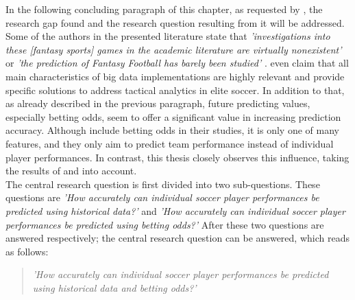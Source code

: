 In the following concluding paragraph of this chapter, as requested by \citet{webster_guest_2002}, the research gap found and the research question resulting from it will be addressed. Some of the authors in the presented literature state that \emph{'investigations into these [fantasy sports] games in the academic literature are virtually nonexistent'} \parencite[, p. 1]{landers_machine_2017} or \emph{'the prediction of Fantasy Football has barely been studied'} \parencite[, p. 1]{lutz_fantasy_2015}. \citet{rein_big_2016} even claim that all main characteristics of big data implementations are highly relevant and provide specific solutions to address tactical analytics in elite soccer. In addition to that, as already described in the previous paragraph, future predicting values, especially betting odds, seem to offer a significant value in increasing prediction accuracy. Although \citet{deng_analysis_2020} include betting odds in their studies, it is only one of many features, and they only aim to predict team performance instead of individual player performances. In contrast, this thesis closely observes this influence, taking the results of \citet{wheatcroft_profiting_2020} and \citet{goldstein_wisdom_2014} into account. \\
The central research question is first divided into two sub-questions. These questions are \emph{'How accurately can individual soccer player performances be predicted using historical data?'} and \emph{'How accurately can individual soccer player performances be predicted using betting odds?'} After these two questions are answered respectively; the central research question can be answered, which reads as follows:
\begin{quote}
    \centering
    \emph{'How accurately can individual soccer player performances be predicted using historical data and betting odds?'}
\end{quote}



